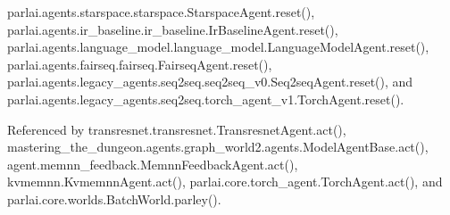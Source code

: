 parlai.\+agents.\+starspace.\+starspace.\+Starspace\+Agent.\+reset(), parlai.\+agents.\+ir\+\_\+baseline.\+ir\+\_\+baseline.\+Ir\+Baseline\+Agent.\+reset(), parlai.\+agents.\+language\+\_\+model.\+language\+\_\+model.\+Language\+Model\+Agent.\+reset(), parlai.\+agents.\+fairseq.\+fairseq.\+Fairseq\+Agent.\+reset(), parlai.\+agents.\+legacy\+\_\+agents.\+seq2seq.\+seq2seq\+\_\+v0.\+Seq2seq\+Agent.\+reset(), and parlai.\+agents.\+legacy\+\_\+agents.\+seq2seq.\+torch\+\_\+agent\+\_\+v1.\+Torch\+Agent.\+reset().



Referenced by transresnet.\+transresnet.\+Transresnet\+Agent.\+act(), mastering\+\_\+the\+\_\+dungeon.\+agents.\+graph\+\_\+world2.\+agents.\+Model\+Agent\+Base.\+act(), agent.\+memnn\+\_\+feedback.\+Memnn\+Feedback\+Agent.\+act(), kvmemnn.\+Kvmemnn\+Agent.\+act(), parlai.\+core.\+torch\+\_\+agent.\+Torch\+Agent.\+act(), and parlai.\+core.\+worlds.\+Batch\+World.\+parley().

